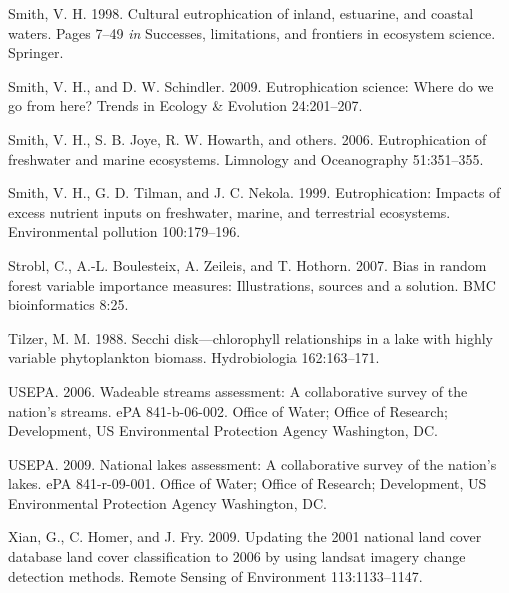 \documentclass[12pt,]{article}
\begin{document}
Smith, V. H. 1998. Cultural eutrophication of inland, estuarine, and
coastal waters. Pages 7--49 \emph{in} Successes, limitations, and
frontiers in ecosystem science. Springer.

Smith, V. H., and D. W. Schindler. 2009. Eutrophication science: Where
do we go from here? Trends in Ecology \& Evolution 24:201--207.

Smith, V. H., S. B. Joye, R. W. Howarth, and others. 2006.
Eutrophication of freshwater and marine ecosystems. Limnology and
Oceanography 51:351--355.

Smith, V. H., G. D. Tilman, and J. C. Nekola. 1999. Eutrophication:
Impacts of excess nutrient inputs on freshwater, marine, and terrestrial
ecosystems. Environmental pollution 100:179--196.

Strobl, C., A.-L. Boulesteix, A. Zeileis, and T. Hothorn. 2007. Bias in
random forest variable importance measures: Illustrations, sources and a
solution. BMC bioinformatics 8:25.

Tilzer, M. M. 1988. Secchi disk---chlorophyll relationships in a lake
with highly variable phytoplankton biomass. Hydrobiologia 162:163--171.

USEPA. 2006. Wadeable streams assessment: A collaborative survey of the
nation's streams. ePA 841-b-06-002. Office of Water; Office of Research;
Development, US Environmental Protection Agency Washington, DC.

USEPA. 2009. National lakes assessment: A collaborative survey of the
nation's lakes. ePA 841-r-09-001. Office of Water; Office of Research;
Development, US Environmental Protection Agency Washington, DC.

Xian, G., C. Homer, and J. Fry. 2009. Updating the 2001 national land
cover database land cover classification to 2006 by using landsat
imagery change detection methods. Remote Sensing of Environment
113:1133--1147.
\end{document}
